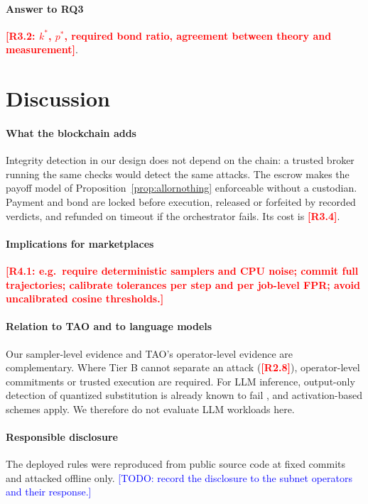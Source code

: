 \documentclass[preprint,review,12pt,authoryear]{elsarticle}
\newcommand{\res}[1]{\textcolor{red}{\textbf{[#1]}}}          %
\newcommand{\todo}[1]{\textcolor{blue}{[TODO: #1]}}            %
\theoremstyle{definition}
\begin{document}
\paragraph{Answer to RQ3} \res{R3.2: $k^\ast$, $p^\ast$, required bond ratio, agreement between theory and measurement}.

\section{Discussion}\label{sec:discussion}

\paragraph{What the blockchain adds} Integrity detection in our design does not depend on the chain: a trusted broker running the same checks would detect the same attacks. The escrow makes the payoff model of Proposition~\ref{prop:allornothing} enforceable without a custodian. Payment and bond are locked before execution, released or forfeited by recorded verdicts, and refunded on timeout if the orchestrator fails. Its cost is \res{R3.4}.

\paragraph{Implications for marketplaces} \res{R4.1: e.g.\ require deterministic samplers and CPU noise; commit full trajectories; calibrate tolerances per step and per job-level FPR; avoid uncalibrated cosine thresholds.}

\paragraph{Relation to TAO and to language models} Our sampler-level evidence and TAO's operator-level evidence are complementary. Where Tier B cannot separate an attack (\res{R2.8}), operator-level commitments or trusted execution are required. For LLM inference, output-only detection of quantized substitution is already known to fail \citep{cai2025substitution}, and activation-based schemes apply. We therefore do not evaluate LLM workloads here.

\paragraph{Responsible disclosure} The deployed rules were reproduced from public source code at fixed commits and attacked offline only. \todo{record the disclosure to the subnet operators and their response.}
\end{document}
